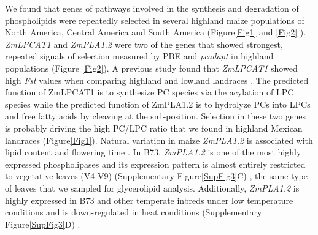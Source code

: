 \documentclass[9pt,twocolumn,twoside,lineno]{BioRxiv}
\begin{document}
We found that genes of pathways involved in the synthesis and degradation of phospholipids were repeatedly selected in several highland maize populations of North America, Central America and South America (Figure\ref{Fig1} and \ref{Fig2} ). 
\textit{ZmLPCAT1} and \textit{ZmPLA1.2} were two of the genes that showed strongest, repeated signals of selection measured by PBE and \textit{pcadapt} in highland populations (Figure \ref{Fig2}). 
A previous study found that \textit{ZmLPCAT1} showed high \textit{Fst} values when comparing highland and lowland landraces \cite{Takuno2015-uj}.
The predicted function of ZmLPCAT1 is to synthesize PC species via the acylation of LPC species while the predicted function of ZmPLA1.2 is to hydrolyze PCs into LPCs and free fatty acids by cleaving at the sn1-position.
Selection in these two genes is probably driving the high PC/LPC ratio that we found in highland Mexican landraces (Figure\ref{Fig1}).
Natural variation in maize \textit{ZmPLA1.2} is associated with lipid content \cite{Riedelsheimer2012-bx} and flowering time \cite{Chen2012-gg, Hung2012-ms}. 
In B73, \textit{ZmPLA1.2} is one of the most highly expressed phospholipases and its expression pattern is almost entirely restricted to vegetative leaves (V4-V9) (Supplementary Figure\ref{SupFig3}C) \cite{Stelpflug2016-vr}, the same type of leaves that we sampled for glycerolipid analysis. 
Additionally, \textit{ZmPLA1.2} is highly expressed in B73 and other temperate inbreds under low temperature conditions and is down-regulated in heat conditions (Supplementary Figure\ref{SupFig3}D) \cite{Waters2017-nat}.
\end{document}

